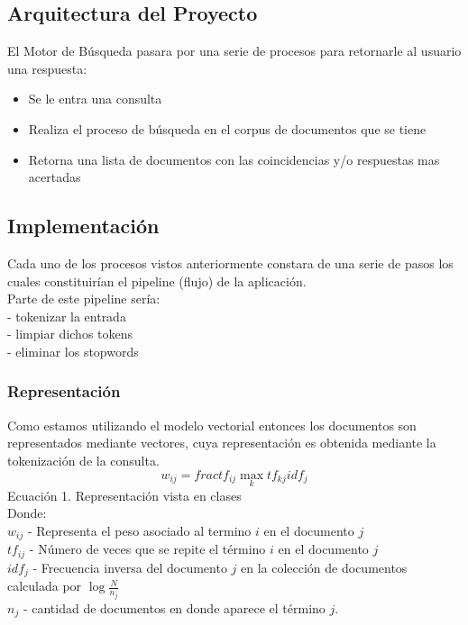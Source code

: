 \documentclass[runningheads]{llncs}
\begin{document}
\subsection*{Arquitectura del Proyecto}
El Motor de Búsqueda pasara por una serie de procesos para retornarle al usuario una respuesta:
\begin{itemize}
	\item Se le entra una consulta
	\item Realiza el proceso de búsqueda en el corpus de documentos que se tiene
	\item Retorna una lista de documentos con las coincidencias y/o respuestas mas acertadas 
\end{itemize}

\subsection*{Implementación}
Cada uno de los procesos vistos anteriormente constara de una serie de pasos los cuales constituirían el pipeline (flujo) de la aplicación.\\

Parte de este pipeline sería: \\
- tokenizar la entrada \\
- limpiar dichos tokens \\
- eliminar los stopwords

\subsubsection*{Representación}
Como estamos utilizando el modelo vectorial entonces los documentos son representados mediante vectores, cuya representación es obtenida mediante la tokenización de la consulta.
\begin{equation}
	w_{ij} = frac{tf_{ij}}{\max_{k} tf_{kj}}idf_{j}
\end{equation}
Ecuación 1. Representación vista en clases\\

Donde:\\
$ w_{ij} $ - Representa el peso asociado al termino $ i $ en el documento $ j $\\
$tf_{ij}$ - Número de veces que se repite el término $i$ en el documento $j$\\
$idf_{j}$ - Frecuencia inversa del documento $j$ en la colección de documentos calculada por $\log{\frac{N}{n_j}}$\\
$n_j$ - cantidad de documentos en donde aparece el término $j$.\\
\end{document}
